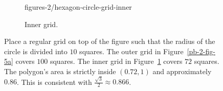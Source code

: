 \begin{figure}[H]
\begin{subfigure}[t]{0.49\linewidth}
{figures-2/hexagon-circle-grid-inner}%
\caption{\label{pb-2-fig-5b}Inner grid.}
\end{subfigure}
\caption{\label{pb-2-fig-5}Place a regular grid on top of the figure such that the radius of the circle is divided into $10$ squares. The outer grid in Figure~\ref{pb-2-fig-5a} covers $100$ squares. The inner grid in  Figure~\ref{pb-2-fig-5b} covers $72$ squares. The polygon's area is strictly inside $(0.72, 1)$ and approximately $0.86$. This is consistent with $\frac{\sqrt{3}}{2}\approx0.866$.}
\end{figure}


% 